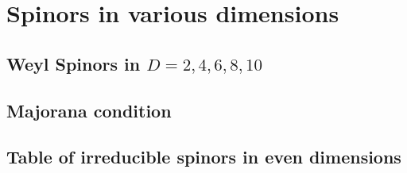 
\chapter{Spinors in various dimensions}
\section{Weyl Spinors in $D = 2,4,6,8,10$}

\section{Majorana condition}

\section{Table of irreducible spinors in even dimensions}
